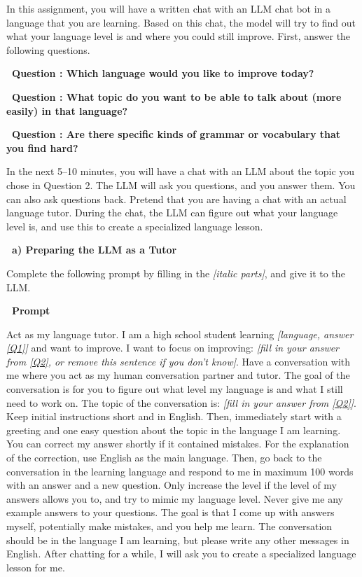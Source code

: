\documentclass[12pt]{article}
\newcounter{exercise}
\newcommand{\exercisetitle}[1]{%
\stepcounter{exercise}
  \vspace{0.5cm}
  \colorbox{maincolor}{%
    \makebox[\dimexpr\linewidth-2\fboxsep][l]{%
      \textcolor{white}{\faPen\ Assignment \theexercise:~ #1}%
    }%
  }
  \vspace{0.3cm}
}
\newcounter{question}
\newcommand{\question}[2][5cm]{%
  \stepcounter{question}
  \vspace{0.3cm}
  \textbf{\faEdit\ Question \thequestion: #2} \\[0.3em]
  
  \begin{Form}
  \TextField[
    name=Q\thequestion,
    multiline=true,
    width=\linewidth,
    height=#1,
    charsize=10pt,
    bordercolor={0 0 0},
    borderwidth=1.8,
    backgroundcolor={1 1 1}
  ]{}
  \end{Form}
  
  \vspace{0.3cm}
}
\begin{document}
\exercisetitle{Level assessment Chat}

In this assignment, you will have a written chat with an LLM chat bot in a language that you are learning. Based on this chat, the model will try to find out what your language level is and where you could still improve. First, answer the following questions. 

\question[2cm]{Which language would you like to improve today?}\label{Q1}

\question{What topic do you want to be able to talk about (more easily) in that language?}\label{Q2}

\question{Are there specific kinds of grammar or vocabulary that you find hard?}\label{Q3}




In the next 5--10 minutes, you will have a chat with an LLM about the topic you chose in Question 2. The LLM will ask you questions, and you answer them. You can also ask questions back. Pretend that you are having a chat with an actual language tutor. During the chat, the LLM can figure out what your language level is, and use this to create a specialized language lesson.


\vspace{0.3cm}
\textcolor{maincolor}{\textbf{\faPen\ a) Preparing the LLM as a Tutor}} 

Complete the following prompt by filling in the \textit{[italic parts]}, and give it to the LLM.

\vspace{0.3cm}
\textcolor{maincolor}{\textbf{\faCopy\ Prompt}}
\begin{promptbox}
Act as my language tutor. I am a high school student learning \textit{[language, answer \cref{Q1}]} and want to improve. I want to focus on improving: \textit{[fill in your answer from \cref{Q2}, or remove this sentence if you don't know]}. Have a conversation with me where you act as my human conversation partner and tutor. The goal of the conversation is for you to figure out what level my language is and what I still need to work on. The topic of the conversation is: \textit{[fill in your answer from \cref{Q2}]}. Keep initial instructions short and in English. Then, immediately start with a greeting and one easy question about the topic in the language I am learning. You can correct my answer shortly if it contained mistakes.
For the explanation of the correction, use English as the main language. Then, go back to the conversation in the learning language and respond to me in maximum 100 words with an answer and a new question. Only increase the level if the level of my answers allows you to, and try to mimic my language level. Never give me any example answers to your questions. The goal is that I come up with answers myself, potentially make mistakes, and you help me learn.
The conversation should be in the language I am learning, but please write any other messages in English. After chatting for a while, I will ask you to create a specialized language lesson for me.
\end{promptbox}
\end{document}
